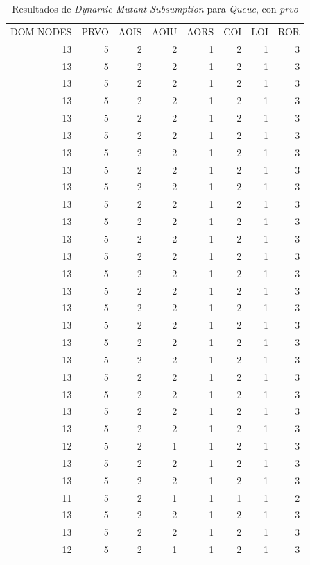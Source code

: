 \begin{table}[]
	\caption{Resultados de \emph{Dynamic Mutant Subsumption} para \emph{Queue}, con \emph{prvo}}
	\label{tables.results.subsumption.queue.prvo}
	\centering
	\scriptsize
	\def\arraystretch{0.95}
	\setlength\tabcolsep{0.5mm}
	\begin{tabular}{rrrrrrrr}
		DOM NODES & PRVO & AOIS & AOIU & AORS & COI & LOI & ROR \\
		13 & 5 & 2 & 2 & 1 & 2 & 1 & 3 \\
		13 & 5 & 2 & 2 & 1 & 2 & 1 & 3 \\
		13 & 5 & 2 & 2 & 1 & 2 & 1 & 3 \\
		13 & 5 & 2 & 2 & 1 & 2 & 1 & 3 \\
		13 & 5 & 2 & 2 & 1 & 2 & 1 & 3 \\
		13 & 5 & 2 & 2 & 1 & 2 & 1 & 3 \\
		13 & 5 & 2 & 2 & 1 & 2 & 1 & 3 \\
		13 & 5 & 2 & 2 & 1 & 2 & 1 & 3 \\
		13 & 5 & 2 & 2 & 1 & 2 & 1 & 3 \\
		13 & 5 & 2 & 2 & 1 & 2 & 1 & 3 \\
		13 & 5 & 2 & 2 & 1 & 2 & 1 & 3 \\
		13 & 5 & 2 & 2 & 1 & 2 & 1 & 3 \\
		13 & 5 & 2 & 2 & 1 & 2 & 1 & 3 \\
		13 & 5 & 2 & 2 & 1 & 2 & 1 & 3 \\
		13 & 5 & 2 & 2 & 1 & 2 & 1 & 3 \\
		13 & 5 & 2 & 2 & 1 & 2 & 1 & 3 \\
		13 & 5 & 2 & 2 & 1 & 2 & 1 & 3 \\
		13 & 5 & 2 & 2 & 1 & 2 & 1 & 3 \\
		13 & 5 & 2 & 2 & 1 & 2 & 1 & 3 \\
		13 & 5 & 2 & 2 & 1 & 2 & 1 & 3 \\
		13 & 5 & 2 & 2 & 1 & 2 & 1 & 3 \\
		13 & 5 & 2 & 2 & 1 & 2 & 1 & 3 \\
		13 & 5 & 2 & 2 & 1 & 2 & 1 & 3 \\
		12 & 5 & 2 & 1 & 1 & 2 & 1 & 3 \\
		13 & 5 & 2 & 2 & 1 & 2 & 1 & 3 \\
		13 & 5 & 2 & 2 & 1 & 2 & 1 & 3 \\
		11 & 5 & 2 & 1 & 1 & 1 & 1 & 2 \\
		13 & 5 & 2 & 2 & 1 & 2 & 1 & 3 \\
		13 & 5 & 2 & 2 & 1 & 2 & 1 & 3 \\
		12 & 5 & 2 & 1 & 1 & 2 & 1 & 3
	\end{tabular}
\end{table}

